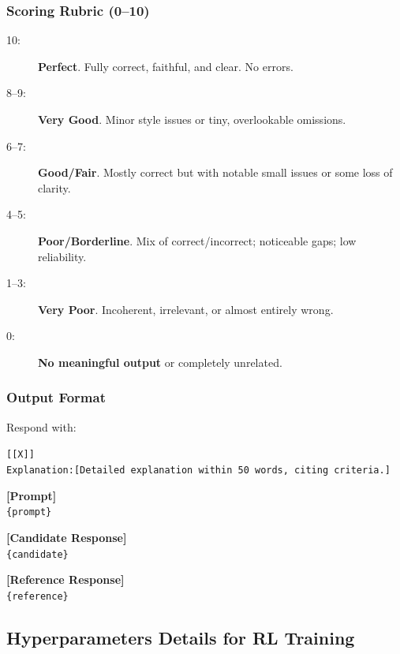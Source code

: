 \begin{tcolorbox}[
    title = {LLM-as-a-judge Prompt}, 
    breakable, 
    colframe=blue!50!black, 
    colback=blue!10,
    fonttitle=\bfseries
]
\tcbline

\subsubsection*{Scoring Rubric (0–10)}
\begin{small}
\begin{description}
    \item[10:] \textbf{Perfect}. Fully correct, faithful, and clear. No errors.
    \item[8--9:] \textbf{Very Good}. Minor style issues or tiny, overlookable omissions.
    \item[6--7:] \textbf{Good/Fair}. Mostly correct but with notable small issues or some loss of clarity.
    \item[4--5:] \textbf{Poor/Borderline}. Mix of correct/incorrect; noticeable gaps; low reliability.
    \item[1--3:] \textbf{Very Poor}. Incoherent, irrelevant, or almost entirely wrong.
    \item[0:] \textbf{No meaningful output} or completely unrelated.
\end{description}
\end{small}

\tcbline

\subsubsection*{Output Format}
Respond with:
\begin{tcolorbox}[colback=white, colframe=gray!30, size=minimal, left=2mm, top=2mm, bottom=2mm]
\texttt{[[X]]} \\
\texttt{Explanation:[Detailed explanation within 50 words, citing criteria.]}
\end{tcolorbox}

\tcbline

\textbf{[Prompt]} \\
\texttt{\{prompt\}}

\medskip
\textbf{[Candidate Response]} \\
\texttt{\{candidate\}}

\medskip
\textbf{[Reference Response]} \\
\texttt{\{reference\}}

\end{tcolorbox}




\subsection{Hyperparameters Details for RL Training} \label{apd:training_details}

